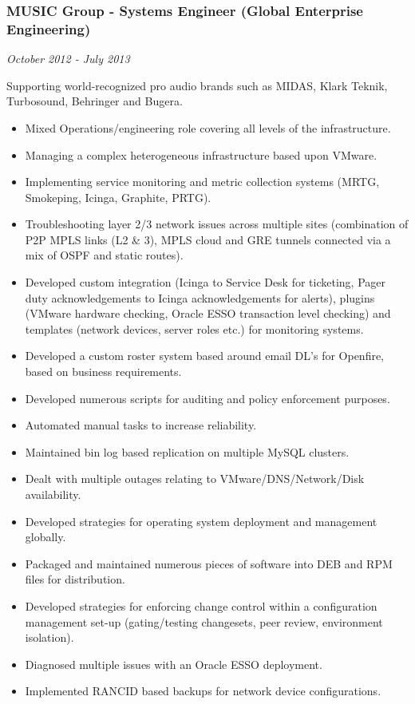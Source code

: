 \subsubsection{MUSIC Group - Systems Engineer (Global Enterprise
Engineering)}\label{music-group---systems-engineer-global-enterprise-engineering}

\emph{October 2012 - July 2013}

Supporting world-recognized pro audio brands such as MIDAS, Klark
Teknik, Turbosound, Behringer and Bugera.

\begin{itemize}
\itemsep1pt\parskip0pt
\item
  Mixed Operations/engineering role covering all levels of the
  infrastructure.
\item
  Managing a complex heterogeneous infrastructure based upon VMware.
\item
  Implementing service monitoring and metric collection systems (MRTG,
  Smokeping, Icinga, Graphite, PRTG).
\item
  Troubleshooting layer 2/3 network issues across multiple sites
  (combination of P2P MPLS links (L2 \& 3), MPLS cloud and GRE tunnels
  connected via a mix of OSPF and static routes).
\item
  Developed custom integration (Icinga to Service Desk for ticketing,
  Pager duty acknowledgements to Icinga acknowledgements for alerts),
  plugins (VMware hardware checking, Oracle ESSO transaction level
  checking) and templates (network devices, server roles etc.) for
  monitoring systems.
\item
  Developed a custom roster system based around email DL's for Openfire,
  based on business requirements.
\item
  Developed numerous scripts for auditing and policy enforcement
  purposes.
\item
  Automated manual tasks to increase reliability.
\item
  Maintained bin log based replication on multiple MySQL clusters.
\item
  Dealt with multiple outages relating to VMware/DNS/Network/Disk
  availability.
\item
  Developed strategies for operating system deployment and management
  globally.
\item
  Packaged and maintained numerous pieces of software into DEB and RPM
  files for distribution.
\item
  Developed strategies for enforcing change control within a
  configuration management set-up (gating/testing changesets, peer
  review, environment isolation).
\item
  Diagnosed multiple issues with an Oracle ESSO deployment.
\item
  Implemented RANCID based backups for network device configurations.
\end{itemize}

